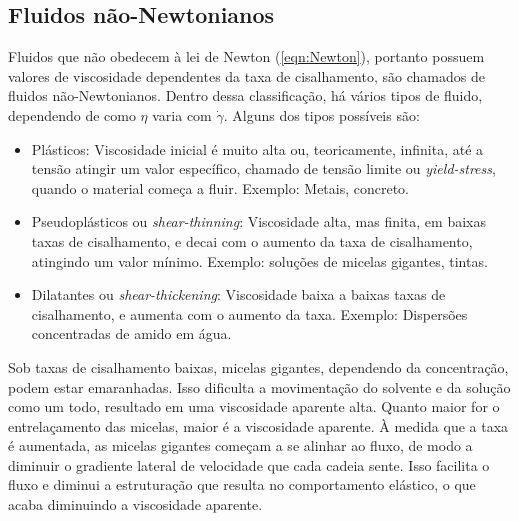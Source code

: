 			\subsection{Fluidos não-Newtonianos} 
			\label{sec:teoria_fluidos_NN}
			Fluidos que não obedecem à lei de Newton (\autoref{eqn:Newton}), portanto possuem valores de viscosidade dependentes da taxa de cisalhamento, são chamados de fluidos não-Newtonianos. Dentro dessa classificação, há vários tipos de fluido, dependendo de como \(\eta\) varia com \(\dot{\gamma}\). Alguns dos tipos possíveis são:\cite{Kronberg2014a}
			
			\begin{itemize}[noitemsep]
				\item Plásticos: Viscosidade inicial é muito alta ou, teoricamente, infinita, até a tensão atingir um valor específico, chamado de tensão limite ou \emph{yield-stress}, quando o material começa a fluir. Exemplo: Metais, concreto.
				\item Pseudoplásticos ou \emph{shear-thinning}: Viscosidade alta, mas finita, em baixas taxas de cisalhamento, e decai com o aumento da taxa de cisalhamento, atingindo um valor mínimo. Exemplo: soluções de micelas gigantes, tintas.
				\item Dilatantes ou \emph{shear-thickening}: Viscosidade baixa a baixas taxas de cisalhamento, e aumenta com o aumento da taxa. Exemplo: Dispersões concentradas de amido em água.
			\end{itemize}
			
			
			Sob taxas de cisalhamento baixas, micelas gigantes, dependendo da concentração, podem estar emaranhadas. Isso dificulta a movimentação do solvente e da solução como um todo, resultado em uma viscosidade aparente alta. Quanto maior for o entrelaçamento das micelas, maior é a viscosidade aparente.    À medida que a taxa é aumentada, as micelas gigantes começam a se alinhar ao fluxo, de modo a diminuir o gradiente lateral de velocidade que cada cadeia sente. Isso facilita o fluxo e diminui a estruturação que resulta no comportamento elástico, o que acaba diminuindo a viscosidade aparente.\cite{Rehage1991}
			
